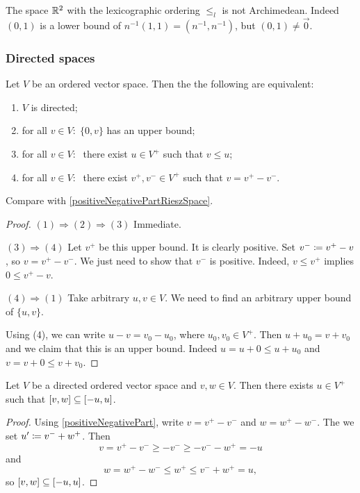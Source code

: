 \begin{example}
The space $\mathbb{R}^2$ with the lexicographic ordering $\leq_l$ is not Archimedean. Indeed $(0,1)$ is a lower bound of $n^{-1}(1,1) = (n^{-1}, n^{-1})$, but $(0,1) \neq \vec{0}$.
\end{example}

\subsubsection{Directed spaces}
\begin{lemma} \label{positiveNegativePart}
Let $V$ be an ordered vector space. Then the the following are equivalent:
\begin{enumerate}
\item $V$ is directed;
\item for all $v\in V: \;\{0,v\}$ has an upper bound;
\item for all $v\in V: \;$ there exist $u\in V^+$ such that $v\leq u$;
\item for all $v\in V: \;$ there exist $v^+, v^- \in V^+$ such that $v = v^+ - v^-$.
\end{enumerate}
\end{lemma}
Compare with \ref{positiveNegativePartRieszSpace}.
\begin{proof}
$(1) \Rightarrow (2) \Rightarrow (3)$ Immediate.

$(3) \Rightarrow (4)$ Let $v^+$ be this upper bound. It is clearly positive. Set $v^- \coloneqq v^+ - v$, so $v = v^+ - v^-$. We just need to show that $v^-$ is positive. Indeed, $v \leq v^+$ implies $0\leq v^+ - v$.

$(4) \Rightarrow (1)$ Take arbitrary $u,v\in V$. We need to find an arbitrary upper bound of $\{u,v\}$.

Using (4), we can write $u-v = v_0 - u_0$, where $u_0,v_0 \in V^+$. Then $u+u_0 = v+v_0$ and we claim that this is an upper bound. Indeed $u = u+0 \leq u + u_0$ and $v = v+0 \leq v+ v_0$.
\end{proof}


\begin{lemma} \label{directedVectorSpaceIntervalInclusion}
Let $V$ be a directed ordered vector space and $v,w\in V$. Then there exists $u\in V^+$ such that $\interval{v,w} \subseteq \interval{-u,u}$.
\end{lemma}
\begin{proof}
Using \ref{positiveNegativePart}, write $v = v^+ - v^-$ and $w = w^+ - w^-$. The we set $u'\coloneqq v^- + w^+$. Then
\[ v = v^+ - v^- \geq -v^- \geq -v^- - w^+ = -u \]
and
\[ w = w^+ - w^- \leq w^+ \leq v^- + w^+ = u, \]
so $\interval{v,w} \subseteq \interval{-u, u}$.
\end{proof}

